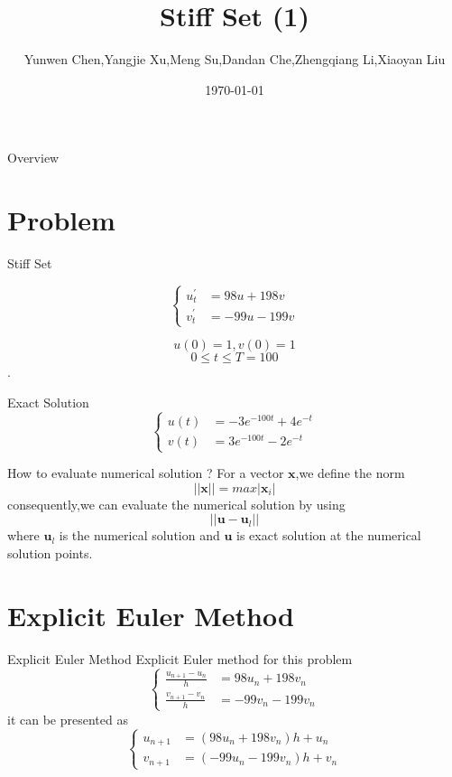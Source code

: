 \documentclass{beamer}
\title{Stiff Set (1)}
\date{\today}
\author{Yunwen Chen,Yangjie Xu,Meng Su,Dandan Che,Zhengqiang Li,Xiaoyan Liu}
\institute{Shenzhen Institute of Advanced Technology,Chinese Academy of Sciences}
\begin{document}
\maketitle
\begin{frame}{Overview}
    \tableofcontents
\end{frame}
 \section{Problem}


 \begin{frame}{Stiff Set}
    
    \[
        \begin{cases}
        u_t^{'} &= 98u+198v\\
        v_t^{'} &= -99u-199v
        \end{cases}
    \]

    $$u(0)=1,v(0)=1$$
    $$0\leq t \leq T =100$$.

 \end{frame}

 \begin{frame}{Exact Solution}
    \[
        \begin{cases}
        u(t) &= -3e^{-100t}+4e^{-t}\\
        v(t) &= 3e^{-100t}-2e^{-t}
        \end{cases}
    \]
    \end{frame}

\begin{frame}{How to evaluate numerical solution ?}
    For a vector $\bm{x}$,we define the norm
    $$||\bm{x}||= max |\bm{x}_i|$$
    consequently,we can evaluate the numerical solution by using
    $$||\bm{u}-\bm{u}_l||$$
    where $\bm{u}_l$ is the numerical solution  and $\bm{u}$ is exact solution at the numerical solution points.

\end{frame} 


 \section{Explicit Euler Method}
 \begin{frame}{Explicit Euler Method}
    Explicit Euler method for this problem
    \[
        \begin{cases}
        \frac{u_{n+1}-u_n}{h} &= 98u_n+198v_n\\
        \frac{v_{n+1}-v_n}{h} &= -99v_n-199v_n
        \end{cases}
    \]
    it can be presented as 
    \[
        \begin{cases}
        u_{n+1} &= (98u_n+198v_n)h+u_n\\
        v_{n+1} &= (-99u_n-199v_n)h+v_n
        \end{cases}
    \]
    \end{frame}
\end{document}
